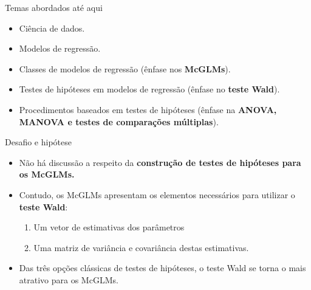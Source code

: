 \documentclass[
  ignorenonframetext,
  serif,
  professionalfont,
  usenames,
  dvipsnames,
  aspectratio = 169]{beamer}
\begin{document}
\begin{frame}{Temas abordados até aqui}
\protect\hypertarget{temas-abordados-atuxe9-aqui}{}
\begin{itemize}
  \itemsep 2ex
    
  \item Ciência de dados.

  \item Modelos de regressão.

  \item Classes de modelos de regressão (ênfase nos \textbf{McGLMs}).

  \item Testes de hipóteses em modelos de regressão (ênfase no \textbf{teste Wald}).

  \item Procedimentos baseados em testes de hipóteses (ênfase na \textbf{ANOVA, MANOVA e testes de comparações múltiplas}).

\end{itemize}
\end{frame}

\begin{frame}{Desafio e hipótese}
\protect\hypertarget{desafio-e-hipuxf3tese}{}
\begin{itemize}
  \itemsep 2ex
    
  \item Não há discussão a respeito da \textbf{construção de testes de hipóteses para os McGLMs.}    

  \item Contudo, os McGLMs apresentam os elementos necessários para utilizar o \textbf{teste Wald}:
    \begin{enumerate}
      \item Um vetor de estimativas dos parâmetros
      \item Uma matriz de variância e covariância destas estimativas.
    \end{enumerate}
    
  \item Das três opções clássicas de testes de hipóteses, o teste Wald se torna o mais atrativo para os McGLMs. 

\end{itemize}
\end{frame}
\end{document}
